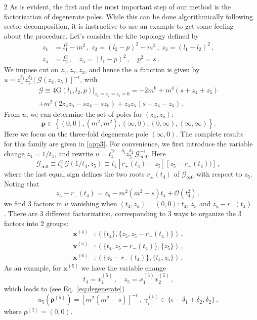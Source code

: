 \documentclass[fleqn]{2023SCGE}
\newcommand{\nn}{\nonumber}
\newcommand{\mG}{\mathcal{G}}
\newcommand{\nG}{\mathrm{G}}
\begin{document}
\begin{multicols}{2}
As is evident, the first and the most important step of our method is the factorization of degenerate poles. While this can be done algorithmically following sector decomposition, it is instructive to use an example to get some feeling about the procedure. Let's consider the kite topology defined by
\begin{align}
    z_1&=l_1^2-m^2 \,,\; z_2=(l_2-p)^2-m^2 \,,\; z_3=(l_1-l_2)^2 \,,\nn
    \\
    z_4&=l_2^2 \,,\quad z_5=(l_1-p)^2 \,,\quad p^2=s \,.
\end{align}
We impose cut on $z_1, z_2, z_3$, and hence the $u$ function is given by $u = z_4^{\delta_1} z_5^{\delta_2} [\mG(z_4,z_5)]^{-\epsilon}$, with
\begin{multline}
\mG\equiv 4\nG(l_1,l_2,p)\Big|_{z_1=z_2=z_3=0} = - 2m^6 + m^4 (s + z_4 + z_5)
\\
+ m^2 (2 z_4 z_5 - s z_4 - s z_5) + z_4 z_5 (s-z_4-z_5) \,.
\label{eq:Gz4z5}
\end{multline}
From $u$, we can determine the set of poles for $(z_4,z_5)$:
\begin{equation}
    \bm{p} \in \left\{ (0,0), (m^2,m^2), (\infty,0), (0,\infty), (\infty,\infty) \right\} .
\end{equation}
Here we focus on the three-fold degenerate pole $(\infty,0)$.
{  The complete results for this family are given in \ref{app3}.}
For convenience, we first introduce the variable change $z_4 = 1/t_4$, and rewrite $u=t_4^{2\epsilon-\delta_1} z_5^{\delta_2} \, \mG_{\infty 0}^{-\epsilon}$. Here
\begin{equation}
    \mG_{\infty 0} \equiv t_4^2 \, \mG(1/t_4,z_5) \equiv t_4 [r_+(t_4) - z_5] [z_5 - r_-(t_4))] \, ,
    \label{eq:Ginf0}
\end{equation}
where the last equal sign defines the two roots $r_\pm(t_4)$ of $\mG_{\infty 0}$ with respect to $z_5$. Noting that
\begin{equation}
    z_5 - r_-(t_4) = z_5 - m^2(m^2-s)t_4 + \mathcal{O}(t_4^2) \,,
    \label{eq:exproot}
\end{equation}
we find 3 factors in $u$ vanishing when $(t_4,z_5)=(0,0)$: $t_4$, $z_5$ and $z_5-r_-(t_4)$. There are 3 different factorization, corresponding to 3 ways to organize the 3 factors into 2 groups:
\begin{align}
\bm{x}^{(4)} &: (\{t_4\} , \{z_5,z_5-r_{-}(t_4)\}) \,,\nn\\
\bm{x}^{(5)} &: (\{t_4,z_5-r_{-}(t_4)\},\{z_5\}) \,,\nn\\
\bm{x}^{(6)} &: (\{z_5-r_{-}(t_4)\} , \{t_4,z_5\}) \,.
\end{align}
As an example, for $\bm{x}^{(5)}$ we have the variable change
\begin{equation}
    t_4 = x^{(5)}_1 \,, \quad z_5 = x^{(5)}_1 x^{(5)}_2 \, ,
\end{equation}
which leads to (see Eq.~\eqref{eq:degenerate})
\begin{equation}
    \bar{u}_5(\bm{\rho}^{(5)}) = [m^2(m^2-s)]^{-\epsilon} \,, \; \gamma^{(5)}_i \in \{ \epsilon-\delta_1 + \delta_2, \delta_2 \} \,,
\end{equation} 
where $\bm{\rho}^{(5)}=(0,0)$.



\end{multicols}
\end{document}
